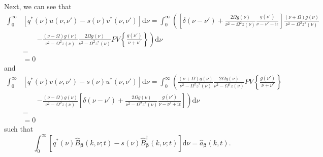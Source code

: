 Next, we can see that
\begin{equation}
\begin{split}
\int_0^\infty&\left[q^*(\nu)u(\nu,\nu') - s(\nu)v^*(\nu,\nu')\right]\mathrm{d}\nu = \int_0^\infty\left(\left[\delta(\nu - \nu') + \frac{2\Omega g(\nu)}{\nu^2 - \Omega^2z(\nu)}\frac{g(\nu')}{\nu - \nu' - \mathrm{i}\epsilon}\right]\frac{(\nu + \Omega)g(\nu)}{\nu^2 - \Omega^2z^*(\nu)}\right.\\
&\qquad\left. - \frac{(\nu - \Omega)g(\nu)}{\nu^2 - \Omega^2z(\nu)}\frac{2\Omega g(\nu)}{\nu^2 - \Omega^2z^*(\nu)}PV\left\{\frac{g(\nu')}{\nu + \nu'}\right\}\right)\mathrm{d}\nu\\[0.5em]
&= \\
&= 0
\end{split}
\end{equation}
and
\begin{equation}
\begin{split}
\int_0^\infty&\left[q^*(\nu)v(\nu,\nu') - s(\nu)u^*(\nu,\nu')\right]\mathrm{d}\nu = \int_0^\infty\left(\frac{(\nu + \Omega)g(\nu)}{\nu^2 - \Omega^2z^*(\nu)}\frac{2\Omega g(\nu)}{\nu^2 - \Omega^2z(\nu)}PV\left\{\frac{g(\nu')}{\nu + \nu'}\right\}\right.\\
&\qquad\left. - \frac{(\nu - \Omega)g(\nu)}{\nu^2 - \Omega^2z(\nu)}\left[\delta(\nu - \nu') + \frac{2\Omega g(\nu)}{\nu^2 - \Omega^2z^*(\nu)}\frac{g(\nu')}{\nu - \nu' + \mathrm{i}\epsilon}\right]\right)\mathrm{d}\nu\\[0.5em]
&= \\
&= 0
\end{split}
\end{equation}
such that
\begin{equation}
\int_0^\infty\left[q^*(\nu)\hat{B}_{\bm{\beta}}(k,\nu;t) - s(\nu)\hat{B}_{\bm{\beta}}^\dagger(k,\nu;t)\right]\mathrm{d}\nu = \hat{a}_{\bm{\beta}}(k,t).
\end{equation}


